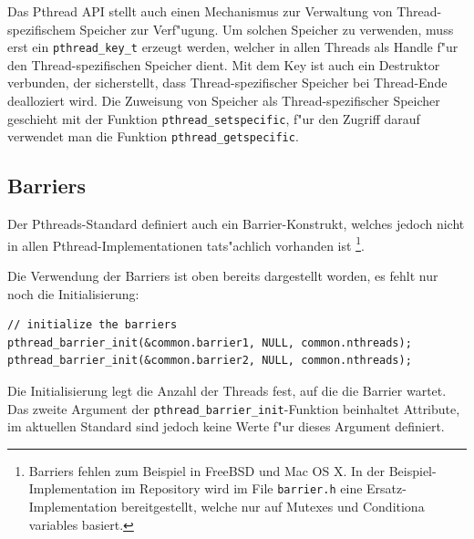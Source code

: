 Das Pthread API stellt auch einen Mechanismus zur Verwaltung von
Thread-spezifischem Speicher zur Verf"ugung. Um solchen Speicher
zu verwenden, muss erst ein \verb+pthread_key_t+ erzeugt werden,
welcher in allen Threads als Handle f"ur den Thread-spezifischen
Speicher dient.
Mit dem Key ist auch ein Destruktor verbunden,
der sicherstellt, dass Thread-spezifischer Speicher bei Thread-Ende 
dealloziert wird. Die Zuweisung von Speicher als Thread-spezifischer
Speicher geschieht mit der Funktion \verb+pthread_setspecific+,
f"ur den Zugriff darauf verwendet man die Funktion \verb+pthread_getspecific+.

\subsection{Barriers}
Der Pthreads-Standard definiert auch ein Barrier-Konstrukt, welches
jedoch nicht in allen Pthread-Implementationen tats"achlich vorhanden ist%
\footnote{Barriers fehlen zum Beispiel in FreeBSD und Mac OS X.
In der Beispiel-Implementation im Repository wird im File
{\tt barrier.h} eine Ersatz-Implementation bereitgestellt, welche nur
auf Mutexes und Conditiona variables basiert.}.

Die Verwendung der Barriers ist oben bereits dargestellt worden, es fehlt
nur noch die Initialisierung:
\begin{verbatim}
// initialize the barriers
pthread_barrier_init(&common.barrier1, NULL, common.nthreads);
pthread_barrier_init(&common.barrier2, NULL, common.nthreads);
\end{verbatim}
Die Initialisierung legt die Anzahl der Threads fest, auf die die Barrier
wartet. Das zweite Argument der \verb+pthread_barrier_init+-Funktion
beinhaltet Attribute, im aktuellen Standard sind jedoch keine Werte
f"ur dieses Argument definiert.

